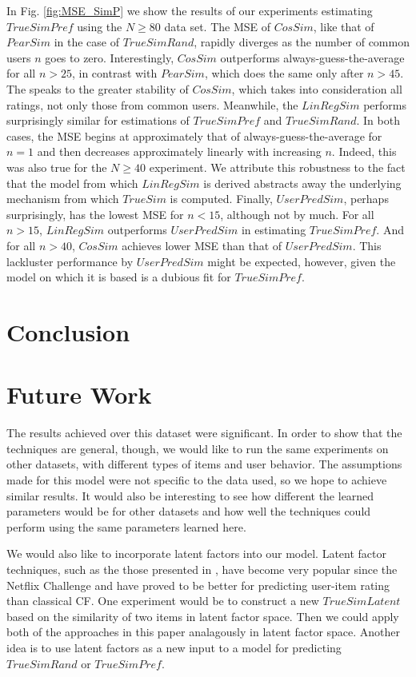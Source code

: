 \documentclass[11pt]{article}
\begin{document}
{In Fig. \ref{fig:MSE_SimP} we show the results of our experiments estimating
$TrueSimPref$ using the $N \geq 80$ data set. The MSE of $CosSim$, like that of
$PearSim$ in the case of $TrueSimRand$, rapidly diverges as the number of common
users $n$ goes to zero. Interestingly, $CosSim$ outperforms
always-guess-the-average for all $n > 25$, in contrast with $PearSim$, which
does the same only after $n > 45$. The speaks to the greater stability of
$CosSim$, which takes into consideration all ratings, not only those from common
users. Meanwhile, the $LinRegSim$ performs surprisingly similar for estimations
of $TrueSimPref$ and $TrueSimRand$. In both cases, the MSE begins at
approximately that of always-guess-the-average for $n = 1$ and then decreases
approximately linearly with increasing $n$. Indeed, this was also true for the
$N \geq 40$ experiment. We attribute this robustness to the fact that the model
from which $LinRegSim$ is derived abstracts away the underlying mechanism from
which $TrueSim$ is computed. Finally, $UserPredSim$, perhaps surprisingly, has
the lowest MSE for $n < 15$, although not by much. For all $n > 15$, $LinRegSim$
outperforms $UserPredSim$ in estimating $TrueSimPref$. And for all $n > 40$,
$CosSim$ achieves lower MSE than that of $UserPredSim$. This lackluster
performance by $UserPredSim$ might be expected, however, given the model on
which it is based is a dubious fit for $TrueSimPref$.


\section*{Conclusion}
\section*{Future Work}
The results achieved over this dataset were significant. In order to show that
the techniques are general, though, we would like to run the same experiments on
other datasets, with different types of items and user behavior. The 
assumptions made for this model were not specific to the data used, so we 
hope to achieve similar results. It would also be interesting to see how 
different the learned parameters would be for other datasets and how well 
the techniques could perform using the same parameters learned here.

We would also like to incorporate latent factors into our model.
Latent factor techniques, such as the those presented in \cite{Koren2009}, have
become very popular since the Netflix Challenge and have proved to be better for
predicting user-item rating than classical CF. One experiment would be to
construct a new $TrueSimLatent$ based on the similarity of two items in 
latent factor space. Then we could apply both of the approaches in this
paper analagously in latent factor space. Another idea is to use latent factors 
as a new input to a model for predicting $TrueSimRand$ or $TrueSimPref$. 

}
\end{document}
